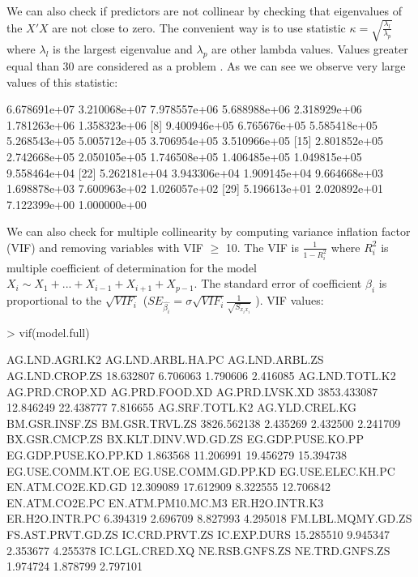 \documentclass[a4paper]{article}
\begin{document}
We can also check if predictors are not collinear by checking that eigenvalues
of the $X'X$ are not close to zero. The convenient way is to use statistic
$\kappa=\sqrt{\frac{\lambda_l}{\lambda_p}}$ where $\lambda_l$ is the largest
eigenvalue and $\lambda_p$ are other lambda values. Values greater equal than 30
are considered as a problem  \cite{Faraway}. As we can see we observe very large
values of this statistic: 
\begin{Schunk}
\begin{Soutput}
 [1] 6.678691e+07 3.210068e+07 7.978557e+06 5.688988e+06 2.318929e+06 1.781263e+06 1.358323e+06
 [8] 9.400946e+05 6.765676e+05 5.585418e+05 5.268543e+05 5.005712e+05 3.706954e+05 3.510966e+05
[15] 2.801852e+05 2.742668e+05 2.050105e+05 1.746508e+05 1.406485e+05 1.049815e+05 9.558464e+04
[22] 5.262181e+04 3.943306e+04 1.909145e+04 9.664668e+03 1.698878e+03 7.600963e+02 1.026057e+02
[29] 5.196613e+01 2.020892e+01 7.122399e+00 1.000000e+00
\end{Soutput}
\end{Schunk}
We can also check for multiple collinearity by computing variance inflation
factor (VIF) and removing variables with VIF $\geq$ 10. The VIF is
$\frac{1}{1-R_i^2}$ where $R_i^2$ is multiple coefficient of determination for
the model $X_i \sim X_1 + ... + X_{i-1} + X_{i+1} + X_{p-1}$. The standard error
of coefficient $\beta_i$ is proportional to the $\sqrt{VIF_i}$
($SE_{\hat{\beta_i}}=\sigma\sqrt{VIF_i}\frac{1}{\sqrt{S_{x_ix_i}}}$
\cite{Faraway}). VIF values:
\begin{Schunk}
\begin{Sinput}
> vif(model.full)	
\end{Sinput}
\begin{Soutput}
      AG.LND.AGRI.K2    AG.LND.ARBL.HA.PC       AG.LND.ARBL.ZS       AG.LND.CROP.ZS 
           18.632807             6.706063             1.790606             2.416085 
      AG.LND.TOTL.K2       AG.PRD.CROP.XD       AG.PRD.FOOD.XD       AG.PRD.LVSK.XD 
         3853.433087            12.846249            22.438777             7.816655 
      AG.SRF.TOTL.K2       AG.YLD.CREL.KG       BM.GSR.INSF.ZS       BM.GSR.TRVL.ZS 
         3826.562138             2.435269             2.432500             2.241709 
      BX.GSR.CMCP.ZS BX.KLT.DINV.WD.GD.ZS    EG.GDP.PUSE.KO.PP EG.GDP.PUSE.KO.PP.KD 
            1.863568            11.206991            19.456279            15.394738 
   EG.USE.COMM.KT.OE EG.USE.COMM.GD.PP.KD    EG.USE.ELEC.KH.PC    EN.ATM.CO2E.KD.GD 
           12.309089            17.612909             8.322555            12.706842 
      EN.ATM.CO2E.PC    EN.ATM.PM10.MC.M3       ER.H2O.INTR.K3       ER.H2O.INTR.PC 
            6.394319             2.696709             8.827993             4.295018 
   FM.LBL.MQMY.GD.ZS    FS.AST.PRVT.GD.ZS       IC.CRD.PRVT.ZS          IC.EXP.DURS 
           15.285510             9.945347             2.353677             4.255378 
      IC.LGL.CRED.XQ       NE.RSB.GNFS.ZS       NE.TRD.GNFS.ZS 
            1.974724             1.878799             2.797101 
\end{Soutput}
\end{Schunk}
\end{document}
